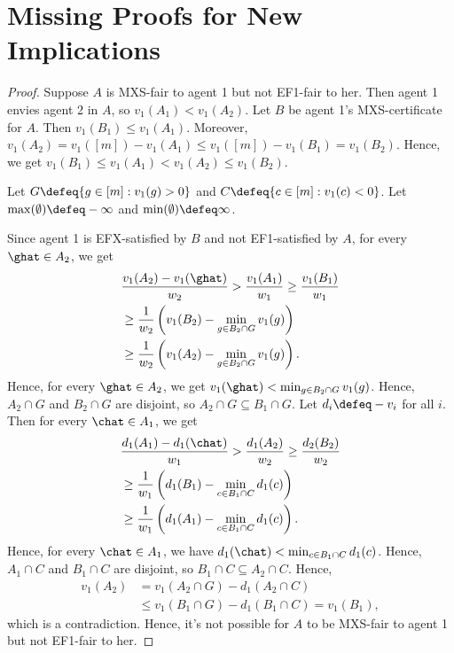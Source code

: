 \section{Missing Proofs for New Implications}
\label{sec:new-impls-extra}

\begin{proof}
Suppose $A$ is MXS-fair to agent 1 but not EF1-fair to her.
Then agent 1 envies agent 2 in $A$, so $v_1(A_1) < v_1(A_2)$.
Let $B$ be agent 1's MXS-certificate for $A$. Then $v_1(B_1) \le v_1(A_1)$.
Moreover, $v_1(A_2) = v_1([m]) - v_1(A_1) \le v_1([m]) - v_1(B_1) = v_1(B_2)$.
Hence, we get $v_1(B_1) \le v_1(A_1) < v_1(A_2) \le v_1(B_2)$.

Let $G \defeq \{g \in [m]: v_1(g) > 0\}$ and $C \defeq \{c \in [m]: v_1(c) < 0\}$.
Let $\max(\emptyset) \defeq -\infty$ and $\min(\emptyset) \defeq \infty$.

Since agent 1 is EFX-satisfied by $B$ and not EF1-satisfied by $A$,
for every $\ghat \in A_2$, we get
\begin{align*}
& \frac{v_1(A_2) - v_1(\ghat)}{w_2} > \frac{v_1(A_1)}{w_1}
\ge \frac{v_1(B_1)}{w_1}
\\ &\ge \frac{1}{w_2}\left(v_1(B_2) - \min_{g \in B_2 \cap G} v_1(g)\right)
\\ &\ge \frac{1}{w_2}\left(v_1(A_2) - \min_{g \in B_2 \cap G} v_1(g)\right).
\end{align*}
Hence, for every $\ghat \in A_2$, we get $v_1(\ghat) < \min_{g \in B_2 \cap G} v_1(g)$.
Hence, $A_2 \cap G$ and $B_2 \cap G$ are disjoint, so $A_2 \cap G \subseteq B_1 \cap G$.
Let $d_i \defeq -v_i$ for all $i$. Then for every $\chat \in A_1$, we get
\begin{align*}
& \frac{d_1(A_1) - d_1(\chat)}{w_1} > \frac{d_1(A_2)}{w_2}
\ge \frac{d_2(B_2)}{w_2}
\\ &\ge \frac{1}{w_1}\left(d_1(B_1) - \min_{c \in B_1 \cap C} d_1(c)\right)
\\ &\ge \frac{1}{w_1}\left(d_1(A_1) - \min_{c \in B_1 \cap C} d_1(c)\right).
\end{align*}
Hence, for every $\chat \in A_1$, we have $d_1(\chat) < \min_{c \in B_1 \cap C} d_1(c)$.
Hence, $A_1 \cap C$ and $B_1 \cap C$ are disjoint, so $B_1 \cap C \subseteq A_2 \cap C$.
Hence,
\begin{align*}
v_1(A_2) &= v_1(A_2 \cap G) - d_1(A_2 \cap C)
\\ &\le v_1(B_1 \cap G) - d_1(B_1 \cap C) = v_1(B_1),
\end{align*}
which is a contradiction.
Hence, it's not possible for $A$ to be MXS-fair to agent 1 but not EF1-fair to her.
\end{proof}

